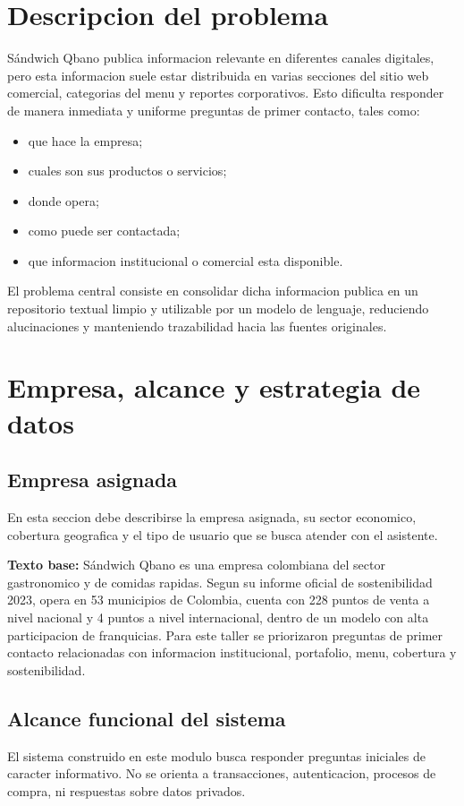 \documentclass[journal]{IEEEtran}
\begin{document}
\section{Descripcion del problema}
Sándwich Qbano publica informacion relevante en diferentes canales digitales, pero esta informacion suele estar distribuida en varias secciones del sitio web comercial, categorias del menu y reportes corporativos. Esto dificulta responder de manera inmediata y uniforme preguntas de primer contacto, tales como:

\begin{itemize}
\item que hace la empresa;
\item cuales son sus productos o servicios;
\item donde opera;
\item como puede ser contactada;
\item que informacion institucional o comercial esta disponible.
\end{itemize}

El problema central consiste en consolidar dicha informacion publica en un repositorio textual limpio y utilizable por un modelo de lenguaje, reduciendo alucinaciones y manteniendo trazabilidad hacia las fuentes originales.

\section{Empresa, alcance y estrategia de datos}
\subsection{Empresa asignada}
En esta seccion debe describirse la empresa asignada, su sector economico, cobertura geografica y el tipo de usuario que se busca atender con el asistente.

\textbf{Texto base:} Sándwich Qbano es una empresa colombiana del sector gastronomico y de comidas rapidas. Segun su informe oficial de sostenibilidad 2023, opera en 53 municipios de Colombia, cuenta con 228 puntos de venta a nivel nacional y 4 puntos a nivel internacional, dentro de un modelo con alta participacion de franquicias. Para este taller se priorizaron preguntas de primer contacto relacionadas con informacion institucional, portafolio, menu, cobertura y sostenibilidad.

\subsection{Alcance funcional del sistema}
El sistema construido en este modulo busca responder preguntas iniciales de caracter informativo. No se orienta a transacciones, autenticacion, procesos de compra, ni respuestas sobre datos privados.
\end{document}
